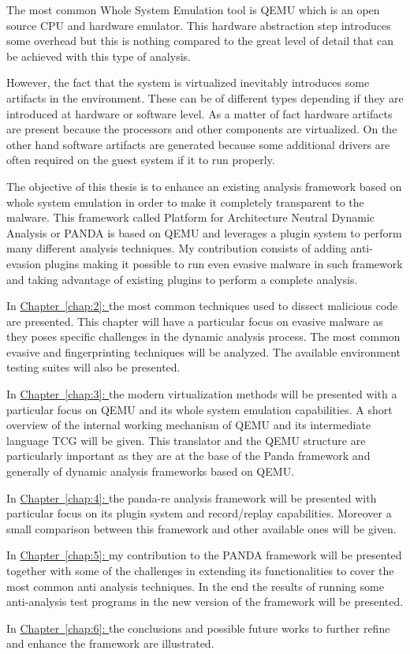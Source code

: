 The most common Whole System Emulation tool is QEMU which is an open source CPU and hardware emulator. This hardware abstraction step introduces some overhead but this is nothing compared to the great level of detail that can be achieved with this type of analysis. 

However, the fact that the system is virtualized inevitably introduces some artifacts in the environment. These can be of different types depending if they are introduced at hardware or software level. As a matter of fact hardware artifacts are present because the processors and other components are virtualized. On the other hand software artifacts are generated because some additional drivers are often required on the guest system if it to run properly. 

The objective of this thesis is to enhance an existing analysis framework based on whole system emulation in order to make it completely transparent to the malware. This framework called Platform for Architecture Neutral Dynamic Analysis or PANDA is based on QEMU and leverages a plugin system to perform many different analysis techniques. My contribution consists of adding anti-evasion plugins making it possible to run even evasive malware in such framework and taking advantage of existing plugins to perform a complete analysis.


\bigskip
In \hyperref[chap:2]{Chapter~\ref*{chap:2}: } the most common techniques used to dissect malicious code are presented. This chapter will have a particular focus on evasive malware as they poses specific challenges in the dynamic analysis process. The most common evasive and fingerprinting techniques will be analyzed. The available environment testing suites will also be presented. 


\bigskip
In \hyperref[chap:3]{Chapter~\ref*{chap:3}: } the modern virtualization methods will be presented with a particular focus on QEMU and its whole system emulation capabilities. A short overview of the internal working mechanism of QEMU and its intermediate language TCG will be given. This translator and the QEMU structure are particularly important as they are at the base of the Panda framework and generally of dynamic analysis frameworks based on QEMU.


\bigskip
In \hyperref[chap:4]{Chapter~\ref*{chap:4}: } the panda-re analysis framework will be presented with particular focus on its plugin system and record/replay capabilities. Moreover a small comparison between this framework and other available ones will be given. 


\bigskip
In \hyperref[chap:5]{Chapter~\ref*{chap:5}: }  my contribution to the PANDA framework will be presented together with some of the challenges in extending its functionalities to cover the most common anti analysis techniques. In the end the results of running some anti-analysis test programs in the new version of the framework will be presented.


\bigskip
In \hyperref[chap:6]{Chapter~\ref*{chap:6}: } the conclusions and possible future works to further refine and enhance the framework are illustrated.